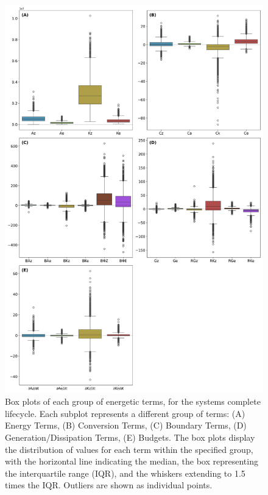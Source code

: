 \begin{figure}[!htbp]
\centering
\includegraphics[width=32pc]{figs_5/box_plot_Total_all_groups.png}
\caption[Box plots - Complete Lifecycle]{Box plots of each group of energetic terms, for the systems complete lifecycle. Each subplot represents a different group of terms: (A) Energy Terms, (B) Conversion Terms, (C) Boundary Terms, (D) Generation/Dissipation Terms, (E) Budgets. The box plots display the distribution of values for each term within the specified group, with the horizontal line indicating the median, the box representing the interquartile range (IQR), and the whiskers extending to 1.5 times the IQR. Outliers are shown as individual points.}
\label{fig:boxplot_energy_total}
\end{figure}

